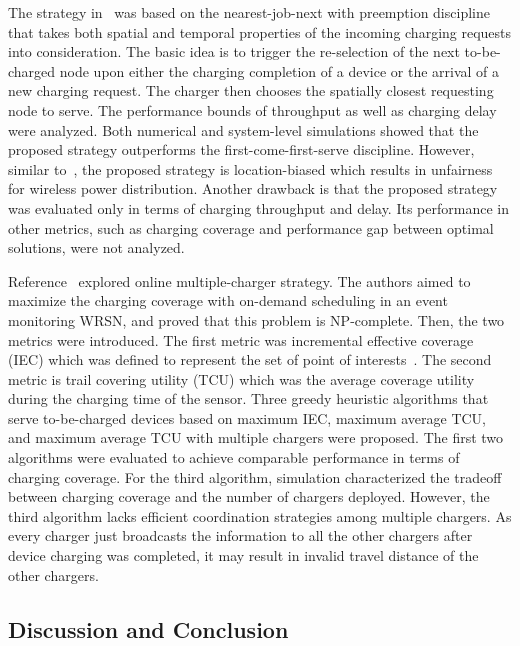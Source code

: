 \documentclass[twocolumn,10pt]{IEEEtran}
\begin{document}
The strategy in~\cite{L.HeTMC} was based on the nearest-job-next with preemption discipline that takes both spatial and temporal properties of the incoming charging requests into consideration. The basic idea is to trigger the re-selection of the next to-be-charged node upon either the charging completion of a device or the arrival of a new charging request. The charger then chooses the spatially closest requesting node to serve. The performance bounds of throughput as well as charging delay were analyzed. Both numerical and system-level simulations showed that the proposed strategy outperforms the first-come-first-serve discipline. However, similar to~\cite{X.2014Ren}, the proposed strategy is location-biased which results in unfairness for wireless power distribution. Another drawback is that the proposed strategy was evaluated only in terms of charging throughput and delay. Its performance in other metrics, such as charging coverage and performance gap between optimal solutions, were not analyzed.  

Reference~\cite{L.2014Jiang} explored online multiple-charger strategy. The authors aimed to maximize the charging coverage with on-demand scheduling in an event monitoring WRSN, and proved that this problem is NP-complete. Then, the two metrics were introduced. The first metric was incremental effective coverage (IEC) which was defined to represent the set of point of interests~\cite{H.2010Tan}. The second metric is trail covering utility (TCU) which was the average coverage utility during the charging time of the sensor. Three greedy heuristic algorithms that serve to-be-charged devices based on maximum IEC, maximum average TCU, and maximum average TCU with multiple chargers were proposed. The first two algorithms were evaluated to achieve comparable performance in terms of charging coverage. For the third algorithm, simulation characterized the tradeoff between charging coverage and the number of chargers deployed. However, the third algorithm lacks efficient coordination strategies among multiple chargers. As every charger just broadcasts the information to all the other chargers after device charging was completed, it may result in invalid travel distance of the other chargers.
    
\subsection{Discussion and Conclusion}
\end{document}
